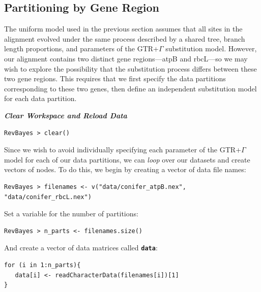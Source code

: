 \documentclass[11pt]{article}
\newcommand{\cl}[1]{{\texttt{\textbf{#1}}}}
\begin{document}
\bigskip
\subsection{Partitioning by Gene Region}\label{secByGene}

The uniform model used in the previous section assumes that all sites in the alignment evolved under the same process described by a shared tree, branch length proportions, and parameters of the GTR+$\Gamma$ substitution model.
However, our alignment contains two distinct gene regions---atpB and rbcL---so we may wish to explore the possibility that the substitution process differs between these two gene regions.
This requires that we first specify the data partitions corresponding to these two genes, then define an independent substitution model for each data partition. 

\textbf{\textit{Clear Workspace and Reload Data}}

{\tt \begin{snugshade*}
\begin{lstlisting}
RevBayes > clear()
\end{lstlisting}
\end{snugshade*}}

Since we wish to avoid individually specifying each parameter of the GTR+$\Gamma$ model for each of our data partitions, we can \textit{loop} over our datasets and create vectors of nodes.
To do this, we begin by creating a vector of data file names:
{\tt \begin{snugshade*}
\begin{lstlisting}
RevBayes > filenames <- v("data/conifer_atpB.nex", "data/conifer_rbcL.nex")
\end{lstlisting}
\end{snugshade*}}

Set a variable for the number of partitions:
{\tt \begin{snugshade*}
\begin{lstlisting}
RevBayes > n_parts <- filenames.size()
\end{lstlisting}
\end{snugshade*}}

And create a vector of data matrices called \cl{data}:
{\tt \begin{snugshade*}
\begin{lstlisting}
for (i in 1:n_parts){
   data[i] <- readCharacterData(filenames[i])[1]
}
\end{lstlisting}
\end{snugshade*}}
\end{document}
